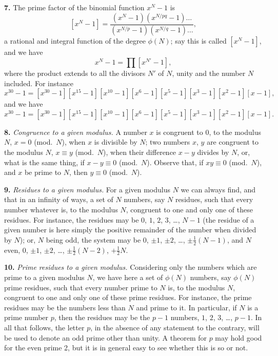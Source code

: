 \documentclass[11pt,a4paper]{book}
\begin{document}
\textbf{7.}\quad
The prime factor of the binomial function $x^{N} - 1$ is
\[
[x^{N} - 1] = \frac{(x^{N} - 1)(x^{N/pq} - 1) \ldots}{(x^{N/p} - 1)(x^{N/q} - 1) \ldots},
\]
a rational and integral function of the degree $\phi(N)$; say this is called $[x^{N} - 1]$, and we have
\[
x^{N} - 1 = \prod [x^{N'} - 1],
\]
where the product extends to all the divisors $N'$ of $N$, unity and the number $N$ included. For instance
\[
x^{30} - 1 = [x^{30} - 1][x^{15} - 1][x^{10} - 1][x^{6} - 1][x^{5} - 1][x^{3} - 1][x^{2} - 1][x - 1],
\]
and we have
\[
x^{30} - 1 = [x^{30} - 1][x^{15} - 1][x^{10} - 1][x^{6} - 1][x^{5} - 1][x^{3} - 1][x^{2} - 1][x - 1].
\]

\textbf{8.}\quad
\textit{Congruence to a given modulus.} A number $x$ is congruent to 0, to the modulus $N$, $x = 0$ (mod.\ $N$), when $x$ is divisible by $N$; two numbers $x$, $y$ are congruent to the modulus $N$, $x \equiv y$ (mod.\ $N$), when their difference $x - y$ divides by $N$, or, what is the same thing, if $x - y \equiv 0$ (mod.\ $N$). Observe that, if $xy \equiv 0$ (mod.\ $N$), and $x$ be prime to $N$, then $y \equiv 0$ (mod.\ $N$).

\textbf{9.}\quad
\textit{Residues to a given modulus.} For a given modulus $N$ we can always find, and that in an infinity of ways, a set of $N$ numbers, say $N$ residues, such that every number whatever is, to the modulus $N$, congruent to one and only one of these residues. For instance, the residues may be $0$, $1$, $2$, $3$, \ldots, $N - 1$ (the residue of a given number is here simply the positive remainder of the number when divided by $N$); or, $N$ being odd, the system may be $0$, $\pm 1$, $\pm 2$, \ldots, $\pm \frac{1}{2}(N - 1)$, and $N$ even, $0$, $\pm 1$, $\pm 2$, \ldots, $\pm \frac{1}{2}(N - 2)$, $+\frac{1}{2}N$.

\textbf{10.}\quad
\textit{Prime residues to a given modulus.} Considering only the numbers which are prime to a given modulus $N$, we have here a set of $\phi(N)$ numbers, say $\phi(N)$ prime residues, such that every number prime to $N$ is, to the modulus $N$, congruent to one and only one of these prime residues. For instance, the prime residues may be the numbers less than $N$ and prime to it. In particular, if $N$ is a prime number $p$, then the residues may be the $p - 1$ numbers, $1$, $2$, $3$, \ldots, $p - 1$. In all that follows, the letter $p$, in the absence of any statement to the contrary, will be used to denote an odd prime other than unity. A theorem for $p$ may hold good for the even prime 2, but it is in general easy to see whether this is so or not.
\end{document}
